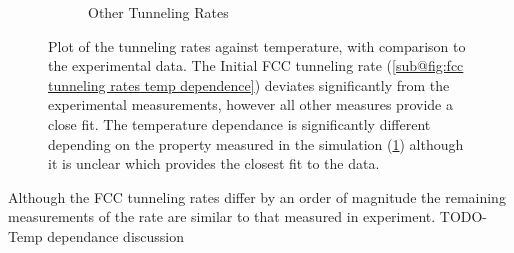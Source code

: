 \begin{figure}[htbp]
\begin{subfigure}{0.45\linewidth}
        \caption{Other Tunneling Rates
        }\label{sub@fig:other tunneling rates temp dependence}
    \end{subfigure}
    \caption{Plot of the tunneling
        rates against temperature, with comparison
        to the experimental data.
        The Initial FCC tunneling rate
        (\cref{sub@fig:fcc tunneling rates temp dependence})
        deviates significantly from the experimental
        measurements, however all other measures
        provide a close fit.
        The temperature dependance
        is significantly different
        depending on the
        property measured
        in the simulation
        (\cref{sub@fig:other tunneling rates temp dependence})
        although it is unclear
        which provides the
        closest fit to the data.
    }\label{fig:tunneling rate against temperature}
\end{figure}
Although the FCC tunneling
rates differ by an order of
magnitude the remaining
measurements of the rate
are similar to that measured
in experiment.
TODO-Temp dependance discussion
